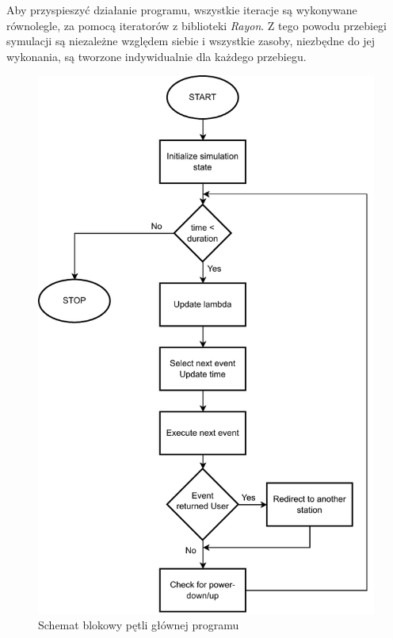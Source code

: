 \noindent Aby przyspieszyć działanie programu, wszystkie iteracje są wykonywane równolegle, za pomocą iteratorów z biblioteki \emph{Rayon}. Z tego powodu przebiegi symulacji są niezależne względem siebie i wszystkie zasoby, niezbędne do jej wykonania, są tworzone indywidualnie dla każdego przebiegu.


\begin{figure}
\center
\includegraphics[scale=0.78]{img/main_loop.pdf} 
\caption{Schemat blokowy pętli głównej programu}
\label{main_loop}
\end{figure}

